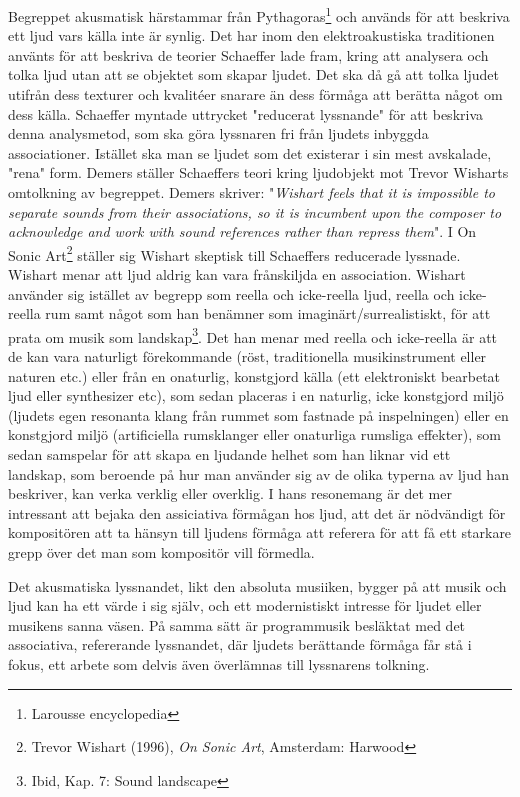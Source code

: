 \documentclass{article}
\begin{document}
Begreppet akusmatisk härstammar från Pythagoras\footnote{Larousse encyclopedia} och används för att beskriva
ett ljud vars källa inte är synlig. Det har inom den elektroakustiska traditionen använts för att beskriva de
teorier Schaeffer lade fram, kring att analysera och tolka ljud utan att se objektet som skapar ljudet.
Det ska då gå att tolka ljudet utifrån dess texturer och kvalitéer snarare än dess förmåga att berätta något om dess
källa. Schaeffer myntade uttrycket "reducerat lyssnande" för att beskriva denna analysmetod, som ska göra
lyssnaren fri från ljudets inbyggda associationer. Istället ska man se ljudet som det existerar i sin mest
avskalade, "rena" form. Demers ställer Schaeffers teori kring ljudobjekt mot Trevor Wisharts omtolkning av
begreppet. Demers skriver: "\emph{Wishart feels that it is impossible to separate sounds from their
associations, so it is incumbent upon the composer to acknowledge and work with sound references rather than
repress them}". I On Sonic Art\footnote{Trevor Wishart (1996), \emph{On Sonic Art}, Amsterdam:
Harwood} ställer sig Wishart skeptisk till Schaeffers reducerade lyssnade. Wishart menar att ljud aldrig kan
vara frånskiljda en association.
Wishart använder sig istället av begrepp som reella och
icke-reella ljud, reella och icke-reella rum samt något som han benämner som imaginärt/surrealistiskt, för att
prata om musik som landskap\footnote{Ibid, Kap. 7: Sound landscape}. Det han menar med reella och icke-reella
är att de kan vara naturligt förekommande (röst, traditionella musikinstrument eller naturen etc.) eller från
en onaturlig, konstgjord källa (ett elektroniskt bearbetat ljud eller synthesizer etc), som sedan placeras i
en naturlig, icke konstgjord miljö (ljudets egen resonanta klang från rummet som fastnade på inspelningen)
eller en konstgjord miljö (artificiella rumsklanger eller onaturliga rumsliga effekter), som sedan samspelar
för att skapa en ljudande helhet som han liknar vid ett landskap, som beroende på hur man använder sig av de
olika typerna av ljud han beskriver, kan verka verklig eller overklig. I hans resonemang är det mer intressant
att bejaka den assiciativa förmågan hos ljud, att det är nödvändigt för kompositören att ta hänsyn till ljudens förmåga att referera för att få ett starkare grepp över det man som kompositör vill
förmedla. 

Det akusmatiska lyssnandet, likt den absoluta musiiken, bygger på att musik och ljud kan ha ett värde i sig
själv, och ett modernistiskt intresse för ljudet eller musikens sanna väsen. 
På samma sätt är programmusik besläktat med det associativa, refererande lyssnandet, där ljudets berättande
förmåga får stå i fokus, ett arbete som delvis även överlämnas till lyssnarens tolkning.
\end{document}
